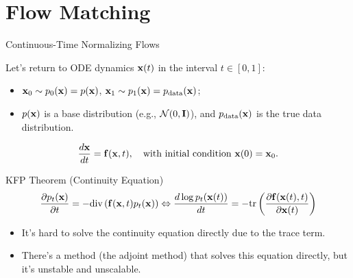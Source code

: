 \documentclass{beamer}
\begin{document}
\section{Flow Matching}
\begin{frame}{Continuous-Time Normalizing Flows}

	Let's return to ODE dynamics $\mathbf{x}(t)$ in the interval $t \in [0, 1]$:
	\begin{itemize}
		\item $\mathbf{x}_0 \sim p_0(\mathbf{x}) = p(\mathbf{x})$, $\mathbf{x}_1 \sim p_1(\mathbf{x}) =  p_{\text{data}}(\mathbf{x})$;
		\item $p(\mathbf{x})$ is a base distribution (e.g., $\mathcal{N}(0, \mathbf{I})$), and $p_{\text{data}}(\mathbf{x})$ is the true data distribution.
	\end{itemize}
	\[
		\frac{d \mathbf{x}}{dt} = \mathbf{f} (\mathbf{x}, t),  \quad \text{with initial condition } \mathbf{x}(0) = \mathbf{x}_0.
	\]
    \eqpause
	\vspace{-0.3cm}
	\begin{block}{KFP Theorem (Continuity Equation)}
		\vspace{-0.5cm}
		\[
			\frac{\partial p_t(\mathbf{x})}{\partial t} = - \text{div}\left(\mathbf{f}(\mathbf{x}, t) p_t(\mathbf{x})\right) \Leftrightarrow \frac{d \log p_t(\mathbf{x}(t))}{d t} = - \text{tr} \left( \frac{\partial \mathbf{f}(\mathbf{x}(t), t)}{\partial \mathbf{x}(t)} \right)
		\]
		\vspace{-0.3cm}
	\end{block}
    \eqpause
	\begin{itemize}
		\item It's hard to solve the continuity equation directly due to the trace term.
		\item There's a method (the adjoint method) that solves this equation directly, but it's unstable and unscalable.
	\end{itemize}
\end{frame}
\end{document}
